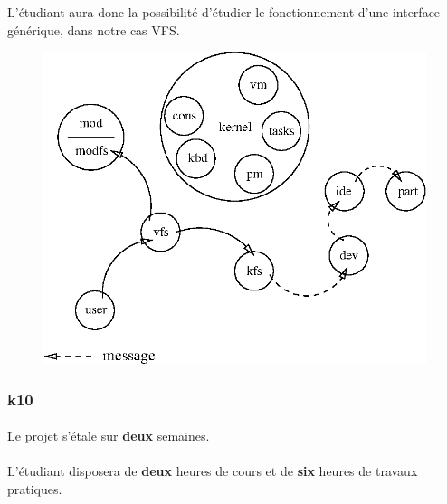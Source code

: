 \documentclass[10pt,a4wide]{article}
\begin{document}
L'\'etudiant aura donc la possibilit\'e d'\'etudier le fonctionnement
d'une interface g\'en\'erique, dans notre cas VFS.

\vspace{5cm}

\begin{figure}[h]
\centerline{\includegraphics{figures/k9.eps}}
\end{figure}

\newpage

\subsubsection{k10}

\paragraph{}

Le projet s'\'etale sur \textbf{deux} semaines.

\paragraph{}

L'\'etudiant disposera de \textbf{deux} heures de cours et de \textbf{six}
heures de travaux pratiques.

\paragraph{}
\end{document}

